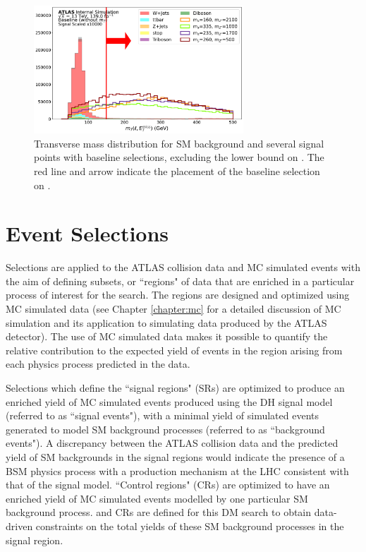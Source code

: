 \begin{figure}[H]
	\centering
	\includegraphics[width=0.7\textwidth]{Figures/5/mT_lep_met_N_1.pdf}
	\caption[]{Transverse mass distribution for SM background and several signal points with baseline selections, excluding the lower bound on \mtlepmet. The red line and arrow indicate the placement of the baseline selection on \mtlepmet.}
	\label{fig:mT_lep_met}
\end{figure}

\section{Event Selections}
\label{sec:evt_selections}

Selections are applied to the ATLAS collision data and MC simulated events with the aim of defining subsets, or ``regions" of data that are enriched in a particular process of interest for the search. The regions are designed and optimized using MC simulated data (see Chapter \ref{chapter:mc} for a detailed discussion of MC simulation and its application to simulating data produced by the ATLAS detector). The use of MC simulated data makes it possible to quantify the relative contribution to the expected yield of events in the region arising from each physics process predicted in the data.

Selections which define the ``signal regions" (SRs) are optimized to produce an enriched yield of MC simulated events produced using the DH signal model (referred to as ``signal events"), with a minimal yield of simulated events generated to model SM background processes (referred to as ``background events"). A discrepancy between the ATLAS collision data and the predicted yield of SM backgrounds in the signal regions would indicate the presence of a BSM physics process with a production mechanism at the LHC consistent with that of the signal model. ``Control regions" (CRs) are optimized to have an enriched yield of MC simulated events modelled by one particular SM background process. \wjets and \ttbar CRs are defined for this DM search to obtain data-driven constraints on the total yields of these SM background processes in the signal region. 

